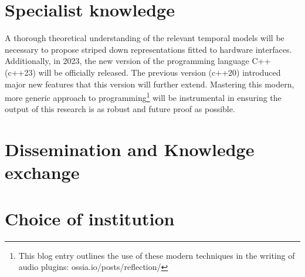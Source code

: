 \documentclass[journal,onecolumn]{IEEEtran}
\begin{document}
\section{Specialist knowledge} %
A thorough theoretical understanding of the relevant temporal models will be necessary to propose striped down representations fitted to hardware interfaces. 
Additionally, in 2023, the new version of the programming language C++ (c++23) will be officially released. The previous version (c++20) introduced major new features that this version will further extend. Mastering this modern, more generic approach to programming\footnote{This blog entry outlines  the use of these modern techniques in the writing of audio plugins: ossia.io/posts/reflection/} will be instrumental in ensuring the output of this research is as robust and future proof as possible. 

\section{Dissemination and Knowledge exchange} %

\section{Choice of institution} %
\end{document}
